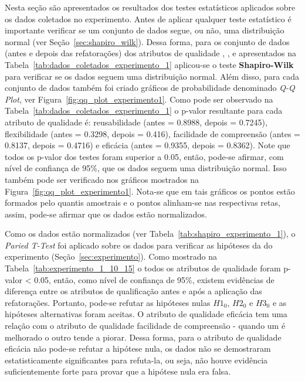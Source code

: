 Nesta seção são apresentados os resultados dos testes estatísticos aplicados sobre os dados coletados no experimento. Antes de aplicar qualquer teste estatístico é importante verificar se um conjunto de dados segue, ou não, uma distribuição normal (ver Seção~\ref{sec:shapiro_wilk}). Dessa forma, para os conjunto de dados (antes e depois das refatorações) dos atributos de qualidade , ,  e  apresentados na Tabela~\ref{tab:dados_coletados_experimento_1} aplicou-se o teste \textbf{Shapiro-Wilk} para verificar se os dados seguem uma distribuição normal. Além disso, para cada conjunto de dados também foi criado gráficos de probabilidade denominado \textit{Q-Q Plot}, ver Figura~\ref{fig:qq_plot_experimento1}. Como pode ser observado na Tabela~\ref{tab:dados_coletados_experimento_1} o p-valor resultante para cada atributo de qualidade é: reusabilidade (antes = 0.8988, depois = 0.7245), flexibilidade (antes = 0.3298, depois = 0.416), facilidade de compreensão (antes = 0.8137, depois = 0.4716) e eficácia (antes = 0.9355, depois = 0.8362). Note que todos os p-valor dos testes foram superior a 0.05, então, pode-se afirmar, com nível de confiança de 95\%, que os dados seguem uma distribuição normal. Isso também pode ser verificado nos gráficos mostrados na Figura~\ref{fig:qq_plot_experimento1}. Nota-se que em tais gráficos os pontos estão formados pelo quantis amostrais e o pontos alinham-se nas respectivas retas, assim, pode-se afirmar que os dados estão normalizados.

Como os dados estão normalizados (ver Tabela~\ref{tab:shapiro_experimento_1}), o \textit{Paried T-Test} foi aplicado sobre os dados para verificar as hipóteses da  do experimento (Seção~\ref{sec:experimento}). Como mostrado na Tabela~\ref{tab:experimento_1_10_15} o todos os atributos de qualidade foram p-valor < 0.05, então, como nível de confiança de 95\%, existem evidências de diferença entre os atributos de qualificação antes e após a aplicação das refatorações. Portanto, pode-se refutar as hipóteses nulas \textbf{$H1_{0}$}, \textbf{$H2_{0}$} e \textbf{$H3_{0}$} e as hipóteses alternativas foram aceitas. O atributo de qualidade eficácia tem uma relação com o atributo de qualidade facilidade de compreensão - quando um é melhorado o outro tende a piorar. Dessa forma, para o atributo de qualidade eficácia não pode-se refutar a hipótese nula, os dados não se demostraram estatisticamente significantes para refuta-la, ou seja, não houve evidência suficientemente forte para provar que a hipótese nula era falsa.

